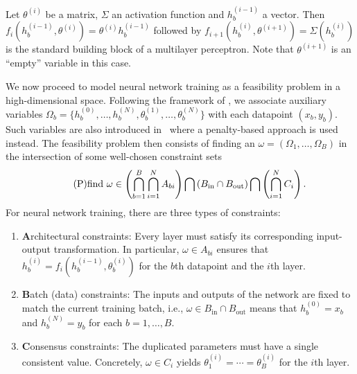 \begin{example} \label{ex:mlp_model}
    Let $\theta^{(i)}$ be a matrix, $\Sigma$ an activation function and $h_b^{(i-1)}$ a vector. Then $f_i(h^{(i-1)}_b, \theta^{(i)}) = \theta^{(i)} h^{(i-1)}_b$ followed by $f_{i+1}(h^{(i)}_b, \theta^{(i+1)}) = \Sigma(h^{(i)}_b)$ is the standard building block of a multilayer perceptron. Note that $\theta^{(i+1)}$ is an ``empty'' variable in this case.
\end{example}
We now proceed to model neural network training as a feasibility problem in a high-dimensional space. Following the framework of \cite{elser2019learning, bergmeister2025projection}, we associate auxiliary variables $\Omega_b =\{h^{(0)}_b, \ldots, h^{(N)}_b, \theta^{(1)}_b, \ldots, \theta_b^{(N)}\}$ with each datapoint $(x_b, y_b)$. Such variables are also introduced in~\cite{carreira2014distributed} where a penalty-based approach is used instead. The feasibility problem then consists of finding an $\omega = (\Omega_1, \ldots, \Omega_B)$ in the intersection of some well-chosen constraint sets
\begin{equation} \label{eq:feasibility} \tag{P}
    \textnormal{find } \omega \in \left(\bigcap_{b=1}^B\bigcap_{i=1}^N A_{bi}\right) \bigcap \left(B_{\mathrm{in}} \cap B_{\mathrm{out}}\right) \bigcap \left(\bigcap_{i=1}^N C_i\right).
\end{equation}
For neural network training, there are three types of constraints:

\begin{enumerate}
    \item \textbf{A}rchitectural constraints: Every layer must satisfy its corresponding input-output transformation. In particular, $\omega \in A_{bi}$ ensures that $h_b^{(i)} = f_i(h_b^{(i-1)}, \theta_b^{(i)})$ for the $b$th datapoint and the $i$th layer.
    \item \textbf{B}atch (data) constraints: The inputs and outputs of the network are fixed to match the current training batch, i.e., $\omega \in B_{\mathrm{in}} \cap B_{\mathrm{out}}$ means that $h_b^{(0)} = x_b$ and $h_b^{(N)} = y_b$ for each $b=1,\ldots,B$.
    \item \textbf{C}onsensus constraints: The duplicated parameters must have a single consistent value. Concretely, $\omega \in C_i$ yields $\theta_1^{(i)} = \cdots = \theta_B^{(i)}$ for the $i$th layer. 
\end{enumerate}

